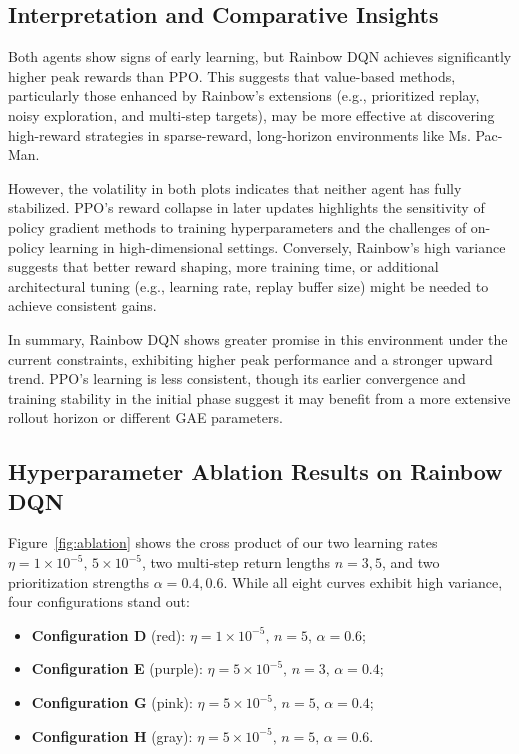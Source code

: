 \documentclass{article}
\begin{document}
\subsection{Interpretation and Comparative Insights}

Both agents show signs of early learning, but Rainbow DQN achieves significantly higher peak rewards than PPO. This suggests that value-based methods, particularly those enhanced by Rainbow’s extensions (e.g., prioritized replay, noisy exploration, and multi-step targets), may be more effective at discovering high-reward strategies in sparse-reward, long-horizon environments like Ms. Pac-Man.

However, the volatility in both plots indicates that neither agent has fully stabilized. PPO’s reward collapse in later updates highlights the sensitivity of policy gradient methods to training hyperparameters and the challenges of on-policy learning in high-dimensional settings. Conversely, Rainbow’s high variance suggests that better reward shaping, more training time, or additional architectural tuning (e.g., learning rate, replay buffer size) might be needed to achieve consistent gains.

In summary, Rainbow DQN shows greater promise in this environment under the current constraints, exhibiting higher peak performance and a stronger upward trend. PPO’s learning is less consistent, though its earlier convergence and training stability in the initial phase suggest it may benefit from a more extensive rollout horizon or different GAE parameters.

\subsection{Hyperparameter Ablation Results on Rainbow DQN}

Figure~\ref{fig:ablation} shows the cross product of our two learning rates \(\eta=1\times10^{-5},\,5\times10^{-5}\), two multi‐step return lengths \(n=3,5\), and two prioritization strengths \(\alpha=0.4,0.6\). While all eight curves exhibit high variance, four configurations stand out:

\begin{itemize}
  \item \textbf{Configuration D} (red): \(\eta=1\times10^{-5},\,n=5,\,\alpha=0.6\);
  \item \textbf{Configuration E} (purple): \(\eta=5\times10^{-5},\,n=3,\,\alpha=0.4\);
  \item \textbf{Configuration G} (pink): \(\eta=5\times10^{-5},\,n=5,\,\alpha=0.4\);
  \item \textbf{Configuration H} (gray): \(\eta=5\times10^{-5},\,n=5,\,\alpha=0.6\).
\end{itemize}
\end{document}
